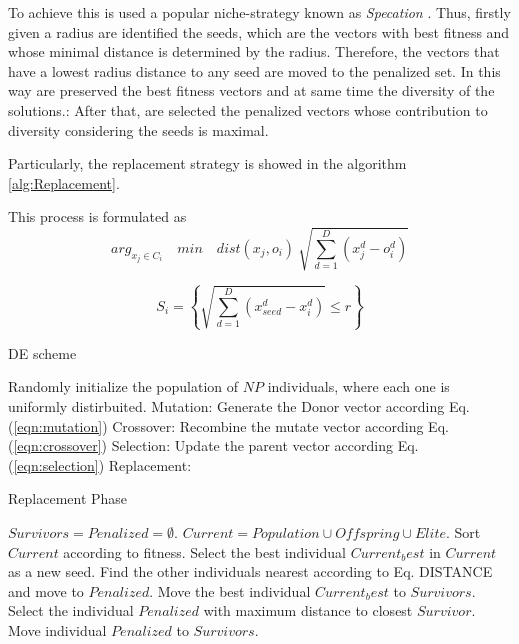 %
To achieve this is used a popular niche-strategy known as \textit{Specation} \cite{yang2017multimodal}.
%
Thus, firstly given a radius are identified the seeds, which are the vectors with best fitness and whose minimal distance is determined by the radius.
%
Therefore, the vectors that have a lowest radius distance to any seed are moved to the penalized set.
%
In this way are preserved the best fitness vectors and at same time the diversity of the solutions.:
%
After that, are selected the penalized vectors whose contribution to diversity considering the seeds is maximal.
%

Particularly, the replacement strategy is showed in the algorithm \ref{alg:Replacement}.


This process is formulated as
\begin{equation}
arg_{x_j \in C_i} \quad min \quad dist(x_j, o_i) \ \sqrt{ \sum_{d=1}^D ( x_j^d - o_i^d )}
\end{equation}

\begin{equation}
S_i = \left \{ \sqrt{ \sum_{d=1}^D (x_{seed}^d - x_i^d )  } \leq r \right \}
\end{equation}


\begin{algorithm}[H]
  \scriptsize
	\caption{DE scheme} 
	\begin{algorithmic}[1]
	\STATE Randomly initialize the population of $NP$ individuals, where each one is uniformly distirbuited.
		\STATE 	Mutation: Generate the Donor vector according Eq. (\ref{eqn:mutation})
		\STATE Crossover: Recombine the mutate vector according Eq. (\ref{eqn:crossover})
		\STATE Selection: Update the parent vector according  Eq. (\ref{eqn:selection})
		\STATE Replacement: 
	   \ENDFOR
	\ENDWHILE
    \label{alg:Fase_Remplazo_VSD-MOEAD}
\end{algorithmic}
\end{algorithm}




\begin{algorithm}[H]
  \scriptsize
	\caption{Replacement Phase} 
	\begin{algorithmic}[1]
	\STATE $Survivors = Penalized = \emptyset$.
	\STATE $Current = Population \cup Offspring \cup Elite$.
	\STATE Sort $Current$ according to fitness.
	   \STATE Select the best individual $Current_best$ in $Current$ as a new seed.
	   \STATE Find the other individuals nearest according to Eq. DISTANCE and move to $Penalized$.
	   \STATE Move the best individual $Current_best$ to $Survivors$.
	\ENDWHILE
	   \STATE Select the individual $Penalized$ with maximum distance to closest $Survivor$.
	   \STATE Move individual $Penalized$ to $Survivors$.
	\ENDWHILE
    \label{alg:Replacement}
\end{algorithmic}
\end{algorithm}


